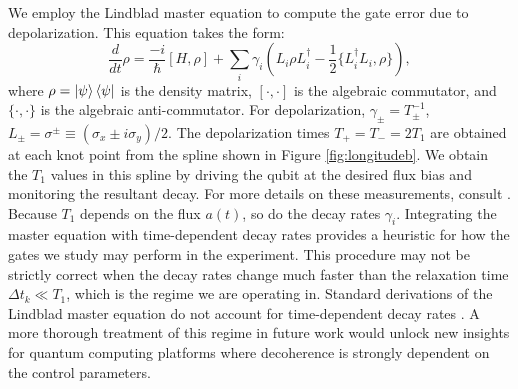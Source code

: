 We employ the Lindblad master equation
to compute the gate error due to depolarization.
This equation takes the form:
\begin{equation}
  \frac{d}{dt} \rho = \frac{-i}{\hbar} [H, \rho]
  + \sum_{i} \gamma_{i} (L_{i} \rho L_{i}^{\dagger}
  - \frac{1}{2} \{L_{i}^{\dagger} L_{i}, \rho\}),
\end{equation}
where $\rho = \ket{\psi}\bra{\psi}$ is the density matrix,
$[\cdot, \cdot]$ is the algebraic commutator, and $\{\cdot, \cdot \}$ is the algebraic
anti-commutator.
For depolarization, $\gamma_{\pm} = T_{\pm}^{-1}$,
$L_{\pm} = \sigma^{\pm} \equiv (\sigma_{x} \pm i \sigma_{y})/2$.
The depolarization times $T_{+} = T_{-} = 2 T_{1}$ are obtained at each knot point
from the spline shown in Figure \ref{fig:longitudeb}.
We obtain the $T_{1}$ values in this spline
by driving the qubit at the desired flux bias
and monitoring the resultant decay. For more details
on these measurements, consult \cite{zhang2020universal}.
Because $T_{1}$ depends on the flux $a(t)$, so do
the decay rates $\gamma_{i}$.
Integrating the master equation with time-dependent decay rates
provides a heuristic for how the gates we study may perform in
the experiment. 
This procedure may not be strictly correct
when the decay rates change much faster
than the relaxation time $\Delta t_{k} \ll T_{1}$,
which is the regime we are operating in. Standard
derivations of the Lindblad master equation do not account for
time-dependent decay rates \cite{manzano2020a}. A more thorough
treatment of this regime in future work would unlock new insights for
quantum computing platforms where decoherence is strongly
dependent on the control parameters.

